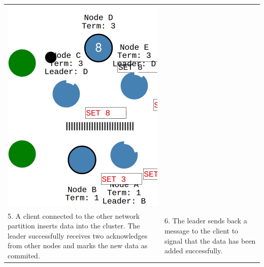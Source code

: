\begin{tabularx}{\textwidth}{ |X|X| }
  \includegraphics[scale=0.28]{scenarios/network_partition/1859.png} \\
  5. A client connected to the other network partition inserts data into the cluster. The leader successfully receives two acknowledges from other nodes and marks the new data as commited.  &
  6. The leader sends back a message to the client to signal that the data has been added successfully. \\
  \hline

\end{tabularx}
